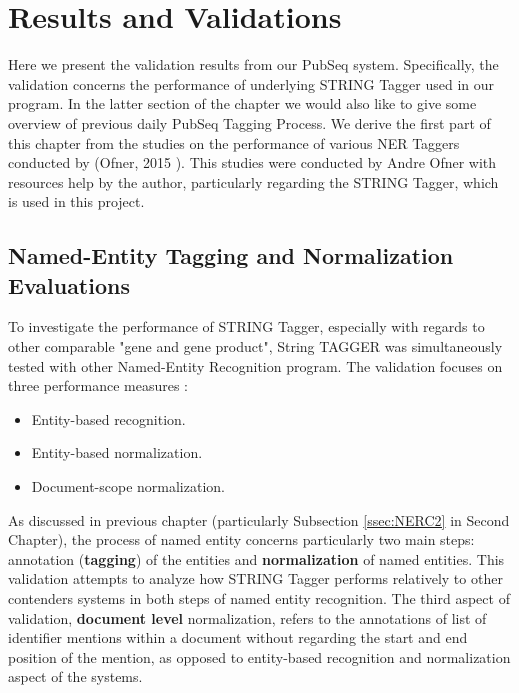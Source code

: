 
\chapter{Results and Validations} %

\label{Chapter7} %


Here we present the validation results from our PubSeq system. Specifically, the validation concerns the performance of underlying STRING Tagger used in our program. In the latter section of the chapter we would also like to give some overview of previous daily PubSeq Tagging Process. We derive the first part of this chapter from the studies on the performance of various NER Taggers conducted by (Ofner, 2015 \citep{ofner2015evaluation}). This studies were conducted by Andre Ofner with resources help by the author, particularly regarding the STRING Tagger, which is used in this project.

\section{Named-Entity Tagging and Normalization Evaluations}

To investigate the performance of STRING Tagger, especially with regards to other comparable "gene and gene product", String TAGGER was simultaneously tested with other Named-Entity Recognition program. The validation focuses on three performance measures \citep{ofner2015evaluation}: 

\begin{itemize}
\item Entity-based recognition.
\item Entity-based normalization.
\item Document-scope normalization.
\end{itemize}

As discussed in previous chapter (particularly Subsection \ref{ssec:NERC2} in Second Chapter), the process of named entity concerns particularly two main steps: annotation (\textbf{tagging}) of the entities and \textbf{normalization} of named entities. This validation attempts to analyze how STRING Tagger performs relatively to other contenders systems in both steps of named entity recognition. The third aspect of validation, \textbf{document level} normalization, refers to the annotations of list of identifier mentions within a document without regarding the start and end position of the mention, as opposed to entity-based recognition and normalization aspect of the systems.

